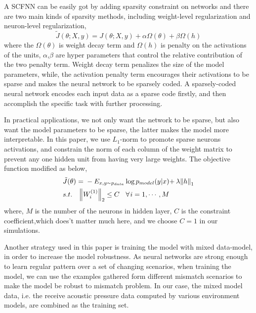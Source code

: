 A SCFNN can be easily got by adding sparsity constraint on networks and there are two main kinds of sparsity methods, including weight-level regularization and neuron-level regularization\cite{goodfellow2016deep},
\begin{equation}
\tilde J(\theta ;X,y) = J(\theta ;X,y) + \alpha \Omega (\theta )+ \beta \Omega (h)
\end{equation}
where the $\Omega (\theta )$ is weight decay term and $\Omega (h)$ is penalty on the activations of the units, $\alpha$,$\beta$ are hyper parameters that control the relative contribution of
the two penalty term. Weight decay term penalizes the size of the model parameters, while, the activation penalty term encourages their activations to be sparse and makes the neural network to be sparsely coded.
A sparsely-coded neural network encodes each input data as a sparse code firstly, and then accomplish the specific task with further processing.

In practical applications, we not only want the network to be sparse, but also want the model parameters to be sparse, the latter makes the model more interpretable. In this paper, we use $L_{1}$-norm to promote sparse neurons activations, and constrain the norm of each column of the weight matrix to prevent any one hidden unit from having very large weights. The objective function modified as below,
\begin{equation}
\begin{split}
&\tilde J(\theta ){\kern 1pt} {\kern 1pt} {\kern 1pt} {\rm{ = }}{\kern 1pt} {\kern 1pt} {\kern 1pt}  - {E_{x,y \sim {p_{data}}}}\log {p_{model}}(y|x){\rm{ + }}{\kern 1pt} {\kern 1pt} \lambda {\left\| h \right\|_1}\\
& s.t.{\kern 1pt} {\kern 1pt} {\kern 1pt} {\kern 1pt} {\kern 1pt} {\kern 1pt} {\kern 1pt} {\kern 1pt} {\kern 1pt} {\kern 1pt} {\left\| {{W^{(1)}_i}} \right\|_2} \le C{\kern 1pt} {\kern 1pt} {\kern 1pt} {\kern 1pt} {\kern 1pt} {\kern 1pt} {\kern 1pt} {\kern 1pt} {\kern 1pt} \forall {\kern 1pt} i = 1, \cdots ,M\\
\end{split}
\end{equation}
where, $M$ is the number of the neurons in hidden layer, $C$ is the constraint coefficient,which does't matter much here, and we choose $C=1$ in our simulations.


Another strategy used in this paper is training the model with mixed data-model, in order to increase the model robustness.
As neural networks are strong enough to learn regular pattern over a set of changing scenarios,
when training the model, we can use the examples gathered form different mismatch scenarios to make the model be robust to mismatch problem. In our case, the mixed model data, i.e. the receive acoustic pressure data computed by various environment models, are combined as the training set.

